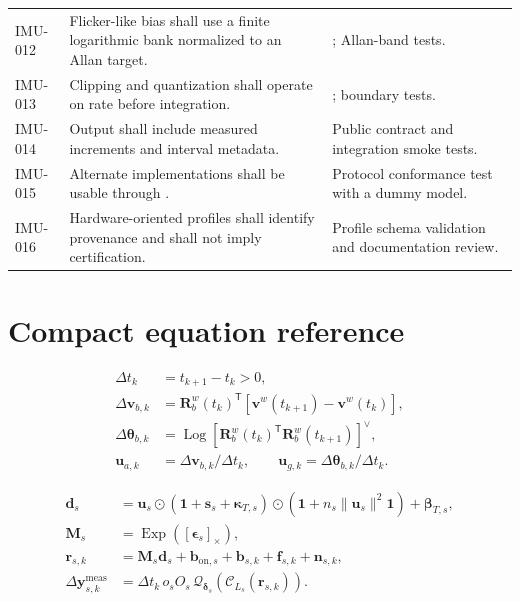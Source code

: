 \documentclass[11pt,oneside,headings=big]{scrreprt}
\newcommand{\Rwb}[1][]{\mathbf{R}^{w}_{b#1}}
\newcommand{\Exp}{\operatorname{Exp}}
\newcommand{\Log}{\operatorname{Log}}
\newcommand{\skewmat}[1]{\left[#1\right]_{\times}}
\newcommand{\Had}{\odot}
\newcommand{\transpose}{\mathsf{T}}
\newcommand{\vect}[1]{\bm{#1}}
\newcommand{\mat}[1]{\bm{#1}}
\begin{document}
\begin{longtable}{@{}L{0.75in}L{2.45in}L{3.05in}@{}}
        IMU-012 & Flicker-like bias shall use a finite logarithmic bank normalized to an Allan target. & ; Allan-band tests. \\
        IMU-013 & Clipping and quantization shall operate on rate before integration. & ; boundary tests. \\
        IMU-014 & Output shall include measured increments and interval metadata. & Public contract and integration smoke tests. \\
        IMU-015 & Alternate implementations shall be usable through . & Protocol conformance test with a dummy model. \\
        IMU-016 & Hardware-oriented profiles shall identify provenance and shall not imply certification. & Profile schema validation and documentation review. \\
        \bottomrule
    \end{longtable}


    \chapter{Compact equation reference}
    \label{app:quick-reference}

    \begin{tcolorbox}[
        enhanced,breakable,colback=ImuPale,colframe=ImuBlue,
        title={Kinematics},fonttitle=\bfseries]
        \begin{align*}
            \Delta t_k&=t_{k+1}-t_k>0,\\
            \Delta\vect v_{b,k}
            &=\Rwb(t_k)^\transpose[\vect v^w(t_{k+1})-\vect v^w(t_k)],\\
            \Delta\vect\theta_{b,k}
            &=\Log[\Rwb(t_k)^\transpose\Rwb(t_{k+1})]^\vee,\\
            \vect u_{a,k}&=\Delta\vect v_{b,k}/\Delta t_k,
            \qquad
            \vect u_{g,k}=\Delta\vect\theta_{b,k}/\Delta t_k.
        \end{align*}
    \end{tcolorbox}

    \begin{tcolorbox}[
        enhanced,breakable,colback=ImuPaleTeal,colframe=ImuTeal,
        title={Deterministic and output model},fonttitle=\bfseries]
        \begin{align*}
            \vect d_s
            &=\vect u_s\Had(\vect1+\vect s_s+\vect\kappa_{T,s})
            \Had(\vect1+n_s\lVert\vect u_s\rVert^2\vect1)+\vect\beta_{T,s},\\
            \mat M_s&=\Exp(\skewmat{\vect\epsilon_s}),\\
            \vect r_{s,k}
            &=\mat M_s\vect d_s+\vect b_{\mathrm{on},s}
            +\vect b_{s,k}+\vect f_{s,k}+\vect n_{s,k},\\
            \Delta\vect y^{\mathrm{meas}}_{s,k}
            &=\Delta t_k\,o_sO_s\,
            \mathcal Q_{\vect\delta_s}(\mathcal C_{L_s}(\vect r_{s,k})).
        \end{align*}
    \end{tcolorbox}
\end{document}
